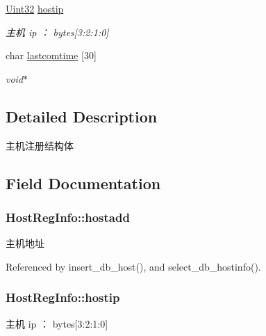 \begin{DoxyCompactItemize}
\hyperlink{base_8h_a60cf7b3c038ce37a50796e8eaddf0b5f}{Uint32} \hyperlink{structHostRegInfo_ac2a4fc92c30a444b52fca1fd0589a027}{hostip}
\begin{DoxyCompactList}\small\item\em 主机 ip ： bytes\mbox{[}3\-:2\-:1\-:0\mbox{]} \end{DoxyCompactList}\item 
char \hyperlink{structHostRegInfo_a20b46c33f6aed2a9d4e11ae3f2ec2cee}{lastcomtime} \mbox{[}30\mbox{]}
\begin{DoxyCompactList}\small\item\em void$\ast$ \end{DoxyCompactList}\end{DoxyCompactItemize}


\subsection{Detailed Description}
主机注册结构体 

\subsection{Field Documentation}
\hypertarget{structHostRegInfo_a3b304abdc867e6ac1d510ccec832e844}{
\subsubsection[{hostadd}]{ Host\-Reg\-Info\-::hostadd}}\label{structHostRegInfo_a3b304abdc867e6ac1d510ccec832e844}


主机地址 



Referenced by insert\-\_\-db\-\_\-host(), and select\-\_\-db\-\_\-hostinfo().

\hypertarget{structHostRegInfo_ac2a4fc92c30a444b52fca1fd0589a027}{
\subsubsection[{hostip}]{ Host\-Reg\-Info\-::hostip}}\label{structHostRegInfo_ac2a4fc92c30a444b52fca1fd0589a027}


主机 ip ： bytes\mbox{[}3\-:2\-:1\-:0\mbox{]} 



